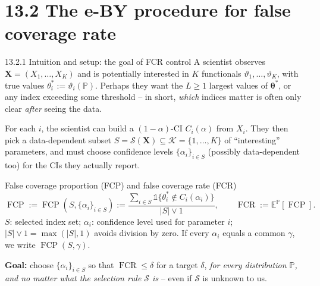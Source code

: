 \documentclass[aspectratio=169,10pt]{beamer}
\newcommand{\E}{\mathbb{E}}
\newcommand{\Pb}{\mathbb{P}}
\newcommand{\calK}{\mathcal{K}}
\newcommand{\calS}{\mathcal{S}}
\DeclareMathOperator{\FCR}{FCR}
\DeclareMathOperator{\FCP}{FCP}
\begin{document}
\section{13.2 The e-BY procedure for false coverage rate}

\begin{frame}{13.2.1 Intuition and setup: the goal of FCR control}
  A scientist observes $\mathbf{X}=(X_1,\dots,X_K)$ and is potentially interested in $K$ functionals $\vartheta_1,\dots,\vartheta_K$, with true values $\theta_i^* := \vartheta_i(\Pb)$. Perhaps they want the $L\geq1$ largest values of $\boldsymbol\theta^*$, or any index exceeding some threshold -- in short, \emph{which} indices matter is often only clear \emph{after} seeing the data.

  \vspace{0.2cm}
  For each $i$, the scientist can build a $(1-\alpha)$-CI $C_i(\alpha)$ from $X_i$. They then pick a data-dependent subset $S=\calS(\mathbf X) \subseteq \calK=\{1,\dots,K\}$ of ``interesting'' parameters, and must choose confidence levels $\{\alpha_i\}_{i\in S}$ (possibly data-dependent too) for the CIs they actually report.

  \begin{block}{False coverage proportion (FCP) and false coverage rate (FCR)}
    \[
      \FCP := \FCP(S,\{\alpha_i\}_{i\in S}) := \frac{\sum_{i\in S}\mathbb{1}\{\theta_i^*\notin C_i(\alpha_i)\}}{|S|\vee 1}, \qquad \FCR := \E^{\Pb}[\FCP].
    \]
    $S$: selected index set; $\alpha_i$: confidence level used for parameter $i$; $|S|\vee1 = \max(|S|,1)$ avoids division by zero. If every $\alpha_i$ equals a common $\gamma$, we write $\FCP(S,\gamma)$.
  \end{block}
  \textbf{Goal:} choose $\{\alpha_i\}_{i\in S}$ so that $\FCR\le\delta$ for a target $\delta$, \emph{for every distribution $\Pb$, and no matter what the selection rule $\calS$ is} -- even if $\calS$ is unknown to us.
\end{frame}
\end{document}
